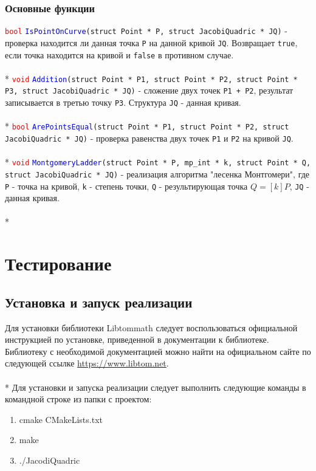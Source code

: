 \documentclass[12pt]{article}
\begin{document}
\subsubsection{Основные функции}
\textcolor{red}{\texttt{bool}} \textcolor{blue}{\texttt{IsPointOnCurve}}\texttt{(struct Point * P, struct JacobiQuadric * JQ)} - проверка находится ли данная точка \texttt{P} на данной кривой \texttt{JQ}. Возвращает \texttt{true}, если точка находится на кривой и \texttt{false} в противном случае.\\
\\*
\textcolor{red}{\texttt{void}} \textcolor{blue}{\texttt{Addition}}\texttt{(struct Point * P1, struct Point * P2, struct Point * P3, struct JacobiQuadric * JQ)} - сложение двух точек \texttt{P1 + P2}, результат записывается в третью точку \texttt{P3}. Структура \texttt{JQ} - данная кривая.\\
\\*
\textcolor{red}{\texttt{bool}} \textcolor{blue}{\texttt{ArePointsEqual}}\texttt{(struct Point * P1, struct Point * P2, struct JacobiQuadric * JQ)} - проверка равенства двух точек \texttt{P1} и \texttt{P2} на кривой \texttt{JQ}.\\
\\*
\textcolor{red}{\texttt{void}} \textcolor{blue}{\texttt{MontgomeryLadder}}\texttt{(struct Point * P, mp\_int * k, struct Point * Q, struct JacobiQuadric * JQ)} - реализация алгоритма "лесенка Монтгомери", где \texttt{P} - точка на кривой, \texttt{k} - степень точки, \texttt{Q} - результирующая точка $Q = [k]P$, \texttt{JQ} - данная кривая.\\
\\*


\section{Тестирование}
\subsection{Установка и запуск реализации}
Для установки библиотеки Libtommath следует воспользоваться официальной инструкцией по установке, приведенной в документации к библиотеке. Библиотеку с необходимой документацией можно найти на официальном сайте по следующей ссылке \url{https://www.libtom.net}. \\
\\*
Для установки и запуска реализации следует выполнить следующие команды в командной строке из папки с проектом:
\begin{enumerate}
\item cmake CMakeLists.txt
\item make
\item ./JacodiQuadric
\end{enumerate}
\end{document}
